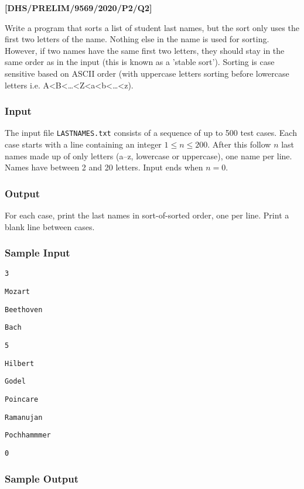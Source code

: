 \item \textbf{{[}DHS/PRELIM/9569/2020/P2/Q2{]} }

Write a program that sorts a list of student last names, but the sort
only uses the first two letters of the name. Nothing else in the name
is used for sorting. However, if two names have the same first two
letters, they should stay in the same order as in the input (this
is known as a 'stable sort'). Sorting is case sensitive based on ASCII
order (with uppercase letters sorting before lowercase letters i.e.
A<B<\dots <Z<a<b<\dots <z). 

\subsubsection*{Input }

The input file \texttt{LASTNAMES.txt} consists of a sequence of up
to 500 test cases. Each case starts with a line containing an integer
$1\le n\leq200$. After this follow $n$ last names made up of only
letters (a--z, lowercase or uppercase), one name per line. Names
have between 2 and 20 letters. Input ends when $n=0$. 

\subsubsection*{Output }

For each case, print the last names in sort-of-sorted order, one per
line. Print a blank line between cases. 

\subsubsection*{Sample Input }

\noindent %
\noindent\begin{minipage}[t]{1\columnwidth}%
\texttt{3 }

\texttt{Mozart }

\texttt{Beethoven }

\texttt{Bach }

\texttt{5 }

\texttt{Hilbert }

\texttt{Godel}

\texttt{Poincare }

\texttt{Ramanujan }

\texttt{Pochhammmer }

\texttt{0 }%
\end{minipage}

\subsubsection*{Sample Output }

